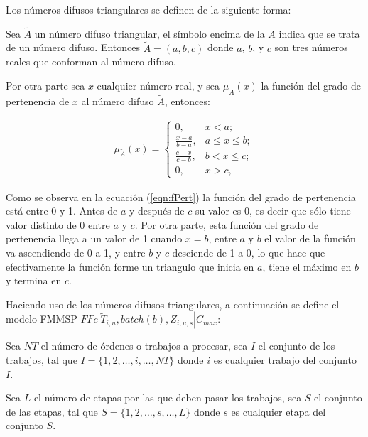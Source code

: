 \documentclass{article}
\def\notac_modelo{$FFc | \tilde{T}_{i, u}, batch(b), Z_{i, u, s} | C_{max}$}
\begin{document}
\vspace{\baselineskip}
Los números difusos triangulares se definen de la siguiente forma: \autocite{fuzzyNum}

\vspace{\baselineskip}
Sea $\tilde{A}$ un número difuso triangular, el símbolo encima de la $A$ indica que se trata de un número difuso. Entonces $\tilde{A} = (a,b,c)$ donde $a$, $b$, y $c$ son tres números reales que conforman al número difuso.

\vspace{\baselineskip}
Por otra parte sea $x$ cualquier número real, y sea $\mu_{\tilde{A}}(x)$ la función del grado de pertenencia de $x$ al número difuso $\tilde{A}$, entonces:

\begin{align}
    \label{eqn:fPert}
    \mu_{\tilde{A}}(x) =
    \begin{cases}
        0,   & x < a;\\
        \frac{x-a}{b-a},   & a \leq x \leq b;\\
        \frac{c-x}{c-b},   & b < x \leq c;\\
        0,   & x > c,
    \end{cases}
\end{align}

Como se observa en la ecuación (\ref{eqn:fPert}) la función del grado de pertenencia está entre 0 y 1. Antes de $a$ y después de $c$ su valor es 0, es decir que sólo tiene valor distinto de 0 entre $a$ y $c$. Por otra parte, esta función del grado de pertenencia llega a un valor de 1 cuando $x = b$, entre $a$ y $b$ el valor de la función va ascendiendo de 0 a 1, y entre $b$ y $c$ desciende de 1 a 0, lo que hace que efectivamente la función forme un triangulo que inicia en $a$, tiene el máximo en $b$ y termina en $c$. \autocite{fuzzyNum}

\vspace{\baselineskip}
Haciendo uso de los números difusos triangulares, a continuación se define el modelo FMMSP \notac_modelo: \autocite{modFMMSP}

\vspace{\baselineskip}
Sea $NT$ el número de órdenes o trabajos a procesar, sea $I$ el conjunto de los trabajos, tal que $I = \{1,2,\dots,i,\dots,NT\}$ donde $i$ es cualquier trabajo del conjunto $I$.

\vspace{\baselineskip}
Sea $L$ el número de etapas por las que deben pasar los trabajos, sea $S$ el conjunto de las etapas, tal que $S = \{1,2,\dots,s,\dots,L\}$ donde $s$ es cualquier etapa del conjunto $S$.
\end{document}
